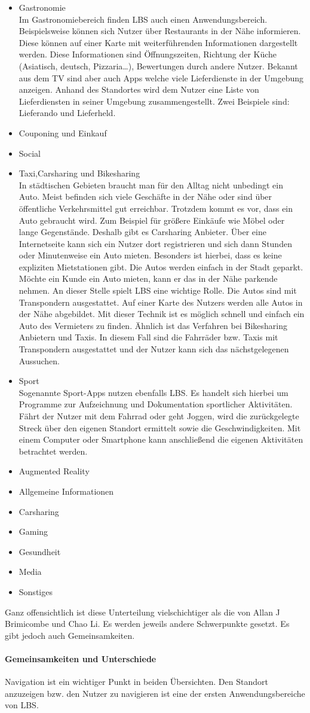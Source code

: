 \begin{itemize}
	\item Gastronomie\\
	Im Gastronomiebereich finden LBS auch einen Anwendungsbereich. Beispielsweise können sich Nutzer über Restaurants in der Nähe informieren. Diese können auf einer Karte mit weiterführenden Informationen dargestellt werden. Diese Informationen sind Öffnungszeiten, Richtung der Küche (Asiatisch, deutsch, Pizzaria…), Bewertungen durch andere Nutzer.
Bekannt aus dem TV sind aber auch Apps welche viele Lieferdienste in der Umgebung anzeigen. Anhand des Standortes wird dem Nutzer eine Liste von Lieferdiensten in seiner Umgebung zusammengestellt. Zwei Beispiele sind: Lieferando und Lieferheld.

	\item Couponing und Einkauf
	\item Social
	\item Taxi,Carsharing und Bikesharing\\
	In städtischen Gebieten braucht man für den Alltag nicht unbedingt ein Auto. Meist befinden sich viele Geschäfte in der Nähe oder sind über öffentliche Verkehrsmittel gut erreichbar. Trotzdem kommt es vor, dass ein Auto gebraucht wird. Zum Beispiel für größere Einkäufe wie Möbel oder lange Gegenstände. Deshalb gibt es Carsharing Anbieter. Über eine Internetseite kann sich ein Nutzer dort registrieren und sich dann Stunden oder Minutenweise ein Auto mieten. Besonders ist hierbei, dass es keine expliziten Mietstationen gibt. Die Autos werden einfach in der Stadt geparkt. Möchte ein Kunde ein Auto mieten, kann er das in der Nähe parkende nehmen. An dieser Stelle spielt LBS eine wichtige Rolle. Die Autos sind mit Transpondern ausgestattet. Auf einer Karte des Nutzers werden alle Autos in der Nähe abgebildet. Mit dieser Technik ist es möglich schnell und einfach ein Auto des Vermieters zu finden. Ähnlich ist das Verfahren bei Bikesharing Anbietern und Taxis. In diesem Fall sind die Fahrräder bzw. Taxis mit Transpondern ausgestattet und der Nutzer kann sich das nächstgelegenen Aussuchen.
	\item Sport\\
	Sogenannte Sport-Apps nutzen ebenfalls LBS. Es handelt sich hierbei um Programme zur Aufzeichnung und Dokumentation sportlicher Aktivitäten. Fährt der Nutzer mit dem Fahrrad oder geht Joggen, wird die zurückgelegte Streck über den eigenen Standort ermittelt  sowie die Geschwindigkeiten. Mit einem Computer oder Smartphone kann anschließend die eigenen Aktivitäten betrachtet werden. 
	\item Augmented Reality
	\item Allgemeine Informationen
	\item Carsharing
	\item Gaming
	\item Gesundheit
	\item Media
	\item Sonstiges
\end{itemize}
Ganz offensichtlich ist diese Unterteilung vielschichtiger als die von Allan J Brimicombe und Chao Li. Es werden jeweils andere Schwerpunkte gesetzt. Es gibt jedoch auch Gemeinsamkeiten.

\paragraph{Gemeinsamkeiten und Unterschiede}
Navigation ist ein wichtiger Punkt in beiden Übersichten. Den Standort anzuzeigen bzw. den Nutzer zu navigieren ist eine der ersten Anwendungsbereiche von LBS.